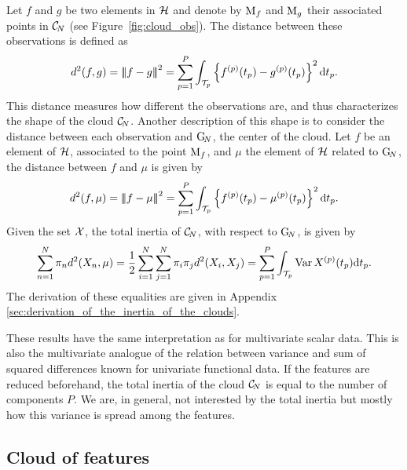 Let $f$ and $g$ be two elements in $\mathcal{H}$ and denote by $\mathrm{M}_f$ and $\mathrm{M}_g$ their associated points in $\mathcal{C}_{\!N}$ (see Figure~\ref{fig:cloud_obs}). The distance between these observations is defined as
\begin{equation}\label{eq:distance_obs}
    d^2(f, g) = \left|\!\left|\!\left|f - g\right|\!\right|\!\right|^2 = \sum_{p = 1}^P \int_{\mathcal{T}_{p}}\left\{f^{(p)}(t_p) - g^{(p)}(t_p)\right\}^2 {\rm d} t_p.
\end{equation}
This distance measures how different the observations are, and thus characterizes the shape of the cloud $\mathcal{C}_{\!N}$. Another description of this shape is to consider the distance between each observation and $\mathrm{G}_{\!N}$, the center of the cloud. Let $f$ be an element of $\mathcal{H}$, associated to the point $\mathrm{M}_f$, and $\mu$ the element of $\mathcal{H}$ related to $\mathrm{G}_{\!N}$, the distance between $f$ and $\mu$ is given by
\begin{equation}\label{eq:distance_center}
    d^2(f, \mu) = \left|\!\left|\!\left|f - \mu\right|\!\right|\!\right|^2 = \sum_{p = 1}^P \int_{\mathcal{T}_{p}}\left\{f^{(p)}(t_p) - \mu^{(p)}(t_p)\right\}^2 {\rm d} t_p.
\end{equation}
Given the set $\mathcal{X}$, the total inertia of $\mathcal{C}_{\!N}$, with respect to $\mathrm{G}_{\!N}$, is given by
\begin{equation}\label{eq:inertia}
    \sum_{n = 1}^N \pi_n d^2(X_n, \mu) = \frac{1}{2}\sum_{i = 1}^N \sum_{j = 1}^N \pi_i \pi_j d^2(X_i, X_j) = \sum_{p = 1}^P \int_{\mathcal{T}_{p}}\operatorname{Var}{X^{(p)}(t_p)} {\rm d} t_p.
\end{equation}
The derivation of these equalities are given in Appendix \ref{sec:derivation_of_the_inertia_of_the_clouds}.

\begin{remark}
    These results have the same interpretation as for multivariate scalar data. This is also the multivariate analogue of the relation between variance and sum of squared differences known for univariate functional data. If the features are reduced beforehand, the total inertia of the cloud $\mathcal{C}_{\!N}$ is equal to the number of components $P$. We are, in general, not interested by the total inertia but mostly how this variance is spread among the features.
\end{remark}


\subsection{Cloud of features} %
\label{sub:cloud_of_features}

